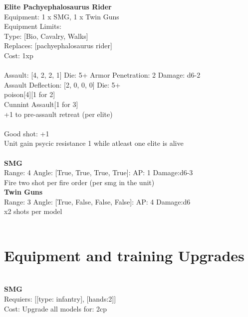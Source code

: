 {\bf Elite Pachyephalosaurus Rider } \\
Equipment: 1 x SMG, 1 x Twin Guns \\
Equipment Limits:  \\
Type: [Bio, Cavalry, Walks] \\
Replaces: [pachyephalosaurus rider] \\
Cost: 1xp\\
\ \\
Assault: [4, 2, 2, 1] Die: 5+ Armor Penetration: 2 Damage: d6-2 \\
Assault Deflection: [2, 0, 0, 0] Die: 5+\\
\indent poison[4][1 for 2]\\ 
Cunnint Assault[1 for 3]\\ 
+1 to pre-assault retreat (per elite)\\ 
 
\ \\
Good shot: +1\\ 
Unit gain psycic resistance 1 while atleast one elite is alive\\ 

\ \\
{\bf SMG } \\



Range: 4  Angle: [True, True, True, True]: AP: 1 Damage:d6-3 \\
Fire two shot per fire order (per smg in the unit)\\ 




{\bf Twin Guns } \\



Range: 3  Angle: [True, False, False, False]: AP: 4 Damage:d6 \\
x2 shots per model\\ 




 
\ \\

\section{Equipment and training Upgrades}\ \\
{\bf SMG } \\

Requiers: [[type: infantry], [hands:2]] \\
Cost: Upgrade all models for: 2cp \\


